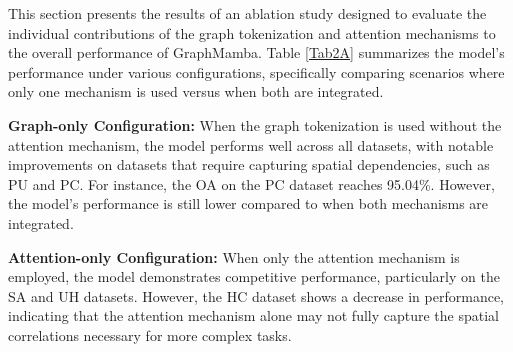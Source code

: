 \documentclass[journal]{IEEEtran}
\begin{document}
This section presents the results of an ablation study designed to evaluate the individual contributions of the graph tokenization and attention mechanisms to the overall performance of GraphMamba. Table \ref{Tab2A} summarizes the model's performance under various configurations, specifically comparing scenarios where only one mechanism is used versus when both are integrated.

\textbf{Graph-only Configuration:} When the graph tokenization is used without the attention mechanism, the model performs well across all datasets, with notable improvements on datasets that require capturing spatial dependencies, such as PU and PC. For instance, the OA on the PC dataset reaches 95.04\%. However, the model's performance is still lower compared to when both mechanisms are integrated.

\textbf{Attention-only Configuration:} When only the attention mechanism is employed, the model demonstrates competitive performance, particularly on the SA and UH datasets. However, the HC dataset shows a decrease in performance, indicating that the attention mechanism alone may not fully capture the spatial correlations necessary for more complex tasks.
\end{document}
